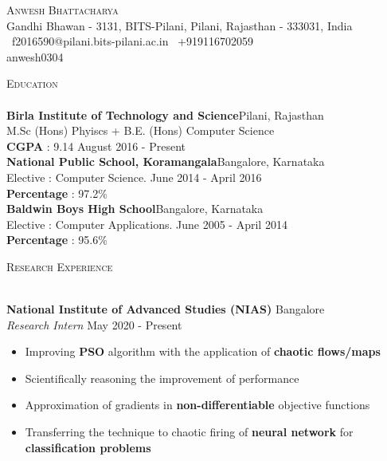 \documentclass[a4paper]{article}
\newcommand{\lineunder} {
    \vspace*{-8pt} \\
    \hspace*{-18pt} \hrulefill \\
}
\newcommand{\header} [1] {
    {\hspace*{-18pt}\vspace*{6pt} \textsc{#1}}
    \vspace*{-6pt} \lineunder
}
\begin{document}
\vspace*{-40pt}

\vspace*{-10pt}
\begin{center}
	{\Huge \scshape {Anwesh Bhattacharya}}\\
	Gandhi Bhawan - 3131, BITS-Pilani, Pilani, Rajasthan - 333031, India \\ \Email \ f2016590@pilani.bits-pilani.ac.in \ \PhoneHandset +919116702059\\
	\ifthenelse{\equal{\cvgithub}{}}{}{\textsc{\Large\faGithub}} \cvgithub anwesh0304 \\
	
\end{center}

\header{Education}
\textbf{Birla Institute of Technology and Science}\hfill Pilani, Rajasthan\\
M.Sc (Hons) Phyiscs + B.E. (Hons) Computer Science \\
\textbf{CGPA} : 9.14 \hfill August 2016 - Present\\
\vspace{2mm}
\textbf{National Public School, Koramangala}\hfill Bangalore, Karnataka\\
Elective : Computer Science. \hfill June 2014 - April 2016\\
\textbf{Percentage} : 97.2\% \\
\vspace{2mm}
\textbf{Baldwin Boys High School}\hfill Bangalore, Karnataka\\
Elective : Computer Applications. \hfill June 2005 - April 2014\\
\textbf{Percentage} : 95.6\% \\
\vspace{2mm}

\header{Research Experience}
\vspace{1mm}

\textbf{National Institute of Advanced Studies (NIAS)} \hfill Bangalore\\
\textit{Research Intern} \hfill May 2020 - Present\\
\vspace{-1mm}
\begin{itemize} \itemsep 1pt
	\item Improving \textbf{PSO} algorithm with the application of \textbf{chaotic flows/maps} 
	\item Scientifically reasoning the improvement of performance
	\item Approximation of gradients in \textbf{non-differentiable} objective functions
	\item Transferring the technique to chaotic firing of \textbf{neural network} for \textbf{classification problems}
\end{itemize}
\end{document}
